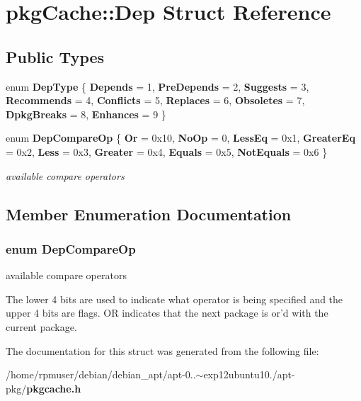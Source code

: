\section{pkg\-Cache\-:\-:\-Dep \-Struct \-Reference}
\label{structpkgCache_1_1Dep}
\subsection*{\-Public \-Types}
\begin{DoxyCompactItemize}
\item 
enum {\bfseries \-Dep\-Type} \{ \*
{\bfseries \-Depends} = 1, 
{\bfseries \-Pre\-Depends} = 2, 
{\bfseries \-Suggests} = 3, 
{\bfseries \-Recommends} = 4, 
\*
{\bfseries \-Conflicts} = 5, 
{\bfseries \-Replaces} = 6, 
{\bfseries \-Obsoletes} = 7, 
{\bfseries \-Dpkg\-Breaks} = 8, 
\*
{\bfseries \-Enhances} = 9
 \}
\item 
enum {\bf \-Dep\-Compare\-Op} \{ \*
{\bfseries \-Or} = 0x10, 
{\bfseries \-No\-Op} = 0, 
{\bfseries \-Less\-Eq} = 0x1, 
{\bfseries \-Greater\-Eq} = 0x2, 
\*
{\bfseries \-Less} = 0x3, 
{\bfseries \-Greater} = 0x4, 
{\bfseries \-Equals} = 0x5, 
{\bfseries \-Not\-Equals} = 0x6
 \}
\begin{DoxyCompactList}\small\item\em available compare operators \end{DoxyCompactList}\end{DoxyCompactItemize}


\subsection{\-Member \-Enumeration \-Documentation}
\subsubsection[{\-Dep\-Compare\-Op}]{\setlength{\rightskip}{0pt plus 5cm}enum {\bf \-Dep\-Compare\-Op}}\label{structpkgCache_1_1Dep_aa3b0f58e581c41bc31d4b96cc4281ad6}


available compare operators 

\-The lower 4 bits are used to indicate what operator is being specified and the upper 4 bits are flags. \-O\-R indicates that the next package is or'd with the current package. 

\-The documentation for this struct was generated from the following file\-:\begin{DoxyCompactItemize}
\item 
/home/rpmuser/debian/debian\-\_\-apt/apt-\/0..$\sim$exp12ubuntu10./apt-\/pkg/{\bf pkgcache.\-h}\end{DoxyCompactItemize}
